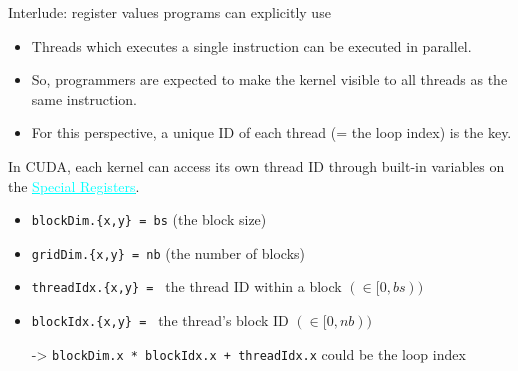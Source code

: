 \documentclass[dvipdfmx, 11pt, aspectratio=169]{beamer}   %
\newcommand{\ulhref}[2]{\href{#1}{\textcolor{cyan}{\uline{#2}}}}
\begin{document}
\begin{frame}[fragile]{Interlude: register values programs can explicitly use}
\begin{itemize}
  \item Threads which executes a single instruction can be executed in parallel.
  \item So, programmers are expected to make the kernel visible to all threads as the same instruction.
  \item For this perspective, a unique ID of each thread (= the loop index) is the key.
\end{itemize}
In CUDA, each kernel can access its own thread ID through built-in variables on the \ulhref{https://docs.nvidia.com/cuda/parallel-thread-execution/\#special-registers}{Special Registers}.
\begin{itemize}
  \item \lstinline|blockDim.{x,y} = bs| (the block size)
  \item \lstinline|gridDim.{x,y} = nb| (the number of blocks)
  \item \lstinline|threadIdx.{x,y} = | the thread ID within a block $(\in [0, bs))$
  \item \lstinline|blockIdx.{x,y} = | the thread's block ID $(\in [0, nb))$
  \item[->] \lstinline|blockDim.x * blockIdx.x + threadIdx.x| could be the loop index
\end{itemize}
\end{frame}
\end{document}
